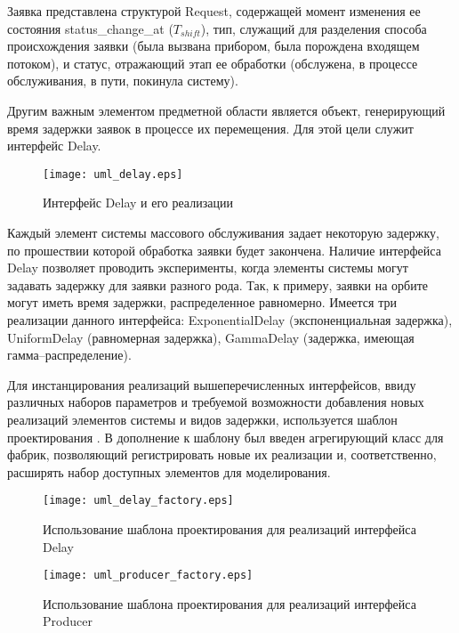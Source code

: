 Заявка представлена структурой Request, содержащей момент изменения ее состояния status\_change\_at ($T_{shift}$), тип, служащий для разделения способа происхождения заявки (была вызвана прибором, была порождена входящем потоком), и статус, отражающий этап ее обработки (обслужена, в процессе обслуживания, в пути, покинула систему).

Другим важным элементом предметной области является объект, генерирующий время задержки заявок в процессе их перемещения. Для этой цели служит интерфейс Delay.
\begin{figure}[H]
	\centering
	\texttt{[image: uml\_delay.eps]}
	\caption{Интерфейс Delay и его реализации}
	\label{uml_delay}
\end{figure}
Каждый элемент системы массового обслуживания задает некоторую задержку, по прошествии которой обработка заявки будет закончена. Наличие интерфейса Delay позволяет проводить эксперименты, когда элементы системы могут задавать задержку для заявки разного рода. Так, к примеру, заявки на орбите могут иметь время задержки, распределенное равномерно. Имеется три реализации данного интерфейса: ExponentialDelay (экспоненциальная задержка), UniformDelay (равномерная задержка), GammaDelay (задержка, имеющая гамма--распределение).

Для инстанцирования реализаций вышеперечисленных интерфейсов, ввиду различных наборов параметров и требуемой возможности добавления новых реализаций элементов системы и видов задержки, используется шаблон проектирования  \cite{lauder1998precise,fowler1997analysis}. В дополнение к шаблону был введен агрегирующий класс для фабрик, позволяющий регистрировать новые их реализации и, соответственно, расширять набор доступных элементов для моделирования.

\begin{figure}[H]
	\centering
	\texttt{[image: uml\_delay\_factory.eps]}
	\caption{Использование шаблона проектирования  для реализаций интерфейса Delay}
	\label{uml_delay_factory}
\end{figure}

\begin{figure}[H]
	\centering
	\texttt{[image: uml\_producer\_factory.eps]}
	\caption{Использование шаблона проектирования  для реализаций интерфейса Producer}
	\label{uml_producer_factory}
\end{figure}


